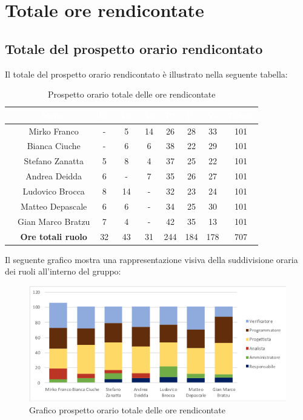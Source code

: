 \section{Totale ore rendicontate}
\subsection{Totale del  prospetto orario rendicontato}
Il totale del prospetto orario rendicontato è illustrato nella seguente tabella:

\begin{table}[ht]
	\begin{center}
		\begin{tabular}{ccccccccc}
			\rowcolor{coolblack}
			\hline
			& \textcolor{white}{Nome} & \textcolor{white}{Re} & \textcolor{white}{Am} & \textcolor{white}{An} & \textcolor{white}{Pt} &\textcolor{white}{Pr} & \textcolor{white}{Ve} & \textcolor{white}{Totale} \\
			\hline
			&Mirko Franco & - & 5 & 14 & 26& 28 & 33 & 101  \\
			&Bianca Ciuche & -& 6& 6 & 38 & 22& 29 &101 \\
			&Stefano Zanatta & 5 & 8& 4 & 37 & 25 & 22 & 101 \\
			&Andrea Deidda &  6& - & 7 &35 & 26 & 27 & 101\\
			&Ludovico Brocca & 8& 14 & - & 32 & 23 & 24 & 101 \\
			&Matteo Depascale & 6& 6& - & 34& 25& 30& 101\\
			&Gian Marco Bratzu & 7& 4 & - & 42 & 35 & 13 &101 \\
			\hline
			&\textbf{Ore totali ruolo} & 32& 43 & 31 & 244 & 184 & 178 & 707 \\
		\end{tabular}
		\caption{Prospetto orario totale delle ore rendicontate}
	\end{center}
\end{table}


Il seguente grafico mostra una rappresentazione visiva della suddivisione oraria dei ruoli all'interno del gruppo:
\begin{figure}[!ht]
	\begin{center}
		\includegraphics[scale=0.80]{images/grafoOreRendicontate.png}
		\caption{Grafico prospetto orario totale delle ore rendicontate}
	\end{center}
\end{figure}

